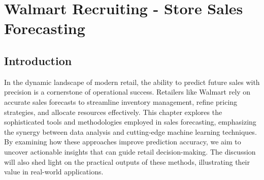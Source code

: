 
\chapter{Walmart Recruiting - Store Sales Forecasting}

\section{Introduction}
In the dynamic landscape of modern retail, the ability to predict future sales with precision is a cornerstone of operational success. Retailers like Walmart rely on accurate sales forecasts to streamline inventory management, refine pricing strategies, and allocate resources effectively. This chapter explores the sophisticated tools and methodologies employed in sales forecasting, emphasizing the synergy between data analysis and cutting-edge machine learning techniques. By examining how these approaches improve prediction accuracy, we aim to uncover actionable insights that can guide retail decision-making. The discussion will also shed light on the practical outputs of these methods, illustrating their value in real-world applications.

